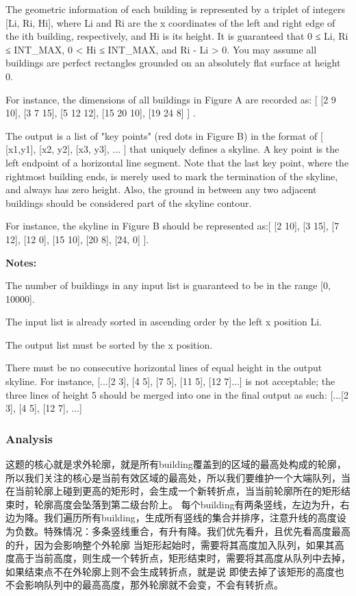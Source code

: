 The geometric information of each building is represented by a triplet of integers [Li, Ri, Hi], where Li and Ri are the x coordinates of the left and right edge of the ith building, respectively, and Hi is its height. It is guaranteed that 0 ≤ Li, Ri ≤ INT_MAX, 0 < Hi ≤ INT_MAX, and Ri - Li > 0. You may assume all buildings are perfect rectangles grounded on an absolutely flat surface at height 0.

For instance, the dimensions of all buildings in Figure A are recorded as: [ [2 9 10], [3 7 15], [5 12 12], [15 20 10], [19 24 8] ] .

The output is a list of "key points" (red dots in Figure B) in the format of [ [x1,y1], [x2, y2], [x3, y3], ... ] that uniquely defines a skyline. A key point is the left endpoint of a horizontal line segment. Note that the last key point, where the rightmost building ends, is merely used to mark the termination of the skyline, and always has zero height. Also, the ground in between any two adjacent buildings should be considered part of the skyline contour.

For instance, the skyline in Figure B should be represented as:[ [2 10], [3 15], [7 12], [12 0], [15 10], [20 8], [24, 0] ].

\textbf{Notes:}

The number of buildings in any input list is guaranteed to be in the range [0, 10000].

The input list is already sorted in ascending order by the left x position Li.

The output list must be sorted by the x position.

There must be no consecutive horizontal lines of equal height in the output skyline. For instance, [...[2 3], [4 5], [7 5], [11 5], [12 7]...] is not acceptable; the three lines of height 5 should be merged into one in the final output as such: [...[2 3], [4 5], [12 7], ...]

\subsubsection{Analysis}

这题的核心就是求外轮廓，就是所有building覆盖到的区域的最高处构成的轮廓，所以我们关注的核心是当前有效区域的最高处，所以我们要维护一个大端队列，当在当前轮廓上碰到更高的矩形时，会生成一个新转折点，当当前轮廓所在的矩形结束时，轮廓高度会坠落到第二级台阶上。
每个building有两条竖线，左边为升，右边为降。我们遍历所有building，生成所有竖线的集合并排序，注意升线的高度设为负数。特殊情况：多条竖线重合，有升有降。我们优先看升，且优先看高度最高的升，因为会影响整个外轮廓
当矩形起始时，需要将其高度加入队列，如果其高度高于当前高度，则生成一个转折点，矩形结束时，需要将其高度从队列中去掉，如果结束点不在外轮廓上则不会生成转折点，就是说
即使去掉了该矩形的高度也不会影响队列中的最高高度，那外轮廓就不会变，不会有转折点。

